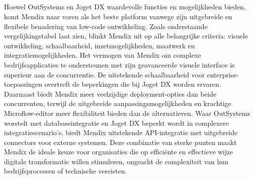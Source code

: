 \subsection{}
Hoewel OutSystems en Joget DX waardevolle functies en mogelijkheden bieden, komt Mendix naar voren als het beste platform vanwege zijn uitgebreide en flexibele benadering van low-code ontwikkeling. Zoals onderstaande vergelijkingstabel laat zien, blinkt Mendix uit op alle belangrijke criteria: visuele ontwikkeling, schaalbaarheid, inzetmogelijkheden, maatwerk en integratiemogelijkheden.
Het vermogen van Mendix om complexe bedrijfsapplicaties te ondersteunen met zijn geavanceerde visuele interface is superieur aan de concurrentie. De uitstekende schaalbaarheid voor enterprise-toepassingen overtreft de beperkingen die bij Joget DX worden ervaren. Daarnaast biedt Mendix meer veelzijdige deployment-opties dan beide concurrenten, terwijl de uitgebreide aanpassingsmogelijkheden en krachtige Microflow-editor meer flexibiliteit bieden dan de alternatieven.
Waar OutSystems worstelt met databaseintegratie en Joget DX beperkt wordt in complexere integratiescenario's, biedt Mendix uitstekende \gls{API}-integratie met uitgebreide connectors voor externe systemen. Deze combinatie van sterke punten maakt Mendix de ideale keuze voor organisaties die op efficiënte en effectieve wijze digitale transformatie willen stimuleren, ongeacht de complexiteit van hun bedrijfsprocessen of technische vereisten.

